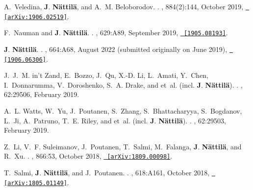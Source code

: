 \documentclass[letterpaper, onecolumn, 11pt]{article}
\begin{document}
\begin{thebibliography}{10}
A.~{Veledina}, \textbf{J}. \textbf{N{\"a}ttil{\"a}}, and A.~M. {Beloborodov}.
.
\newblock {\em \apj}, 884(2):144, October 2019,
  \href{http://arxiv.org/abs/1906.02519}{\nolinkurl{ [arXiv:1906.02519]}}.

F.~{Nauman} and \textbf{J}. \textbf{N{\"a}ttil{\"a}}.
.
\newblock {\em \aap}, 629:A89, September 2019,
  \href{http://arxiv.org/abs/1905.08193}{\nolinkurl{ [1905.08193]}}.

\textbf{J}. \textbf{N{\"a}ttil{\"a}}.
.
, 664:A68, August 2022 (submitted originally on June 2019),
  \href{http://arxiv.org/abs/1906.06306}{\nolinkurl{ [1906.06306]}}.

J.~J.~M. {in't Zand}, E.~{Bozzo}, J.~{Qu}, X.-D. {Li}, L.~{Amati}, Y.~{Chen},
  I.~{Donnarumma}, V.~{Doroshenko}, S.~A. {Drake}, and {et~al. (incl.
  \textbf{J}. \textbf{{N{\"a}ttil{\"a}}})}.
.
, 62:29506,
  February 2019.

A.~L. {Watts}, W.~{Yu}, J.~{Poutanen}, S.~{Zhang}, S.~{Bhattacharyya},
  S.~{Bogdanov}, L.~{Ji}, A.~{Patruno}, T.~E. {Riley}, and {et~al. (incl.
  \textbf{J}. \textbf{{N{\"a}ttil{\"a}}})}.
.
, 62:29503,
  February 2019.

Z.~{Li}, V.~F. {Suleimanov}, J.~{Poutanen}, T.~{Salmi}, M.~{Falanga},
  \textbf{J}. {\textbf{N{\"a}ttil{\"a}}}, and R.~{Xu}.
.
\newblock {\em \apj}, 866:53, October 2018,
  \href{http://arxiv.org/abs/1809.00098}{\nolinkurl{ [arXiv:1809.00098]}}.

T.~{Salmi}, \textbf{J}. \textbf{{N{\"a}ttil{\"a}}}, and J.~{Poutanen}.
.
\newblock {\em \aap}, 618:A161, October 2018,
  \href{http://arxiv.org/abs/1805.01149}{\nolinkurl{ [arXiv:1805.01149]}}.


\end{thebibliography}
\end{document}

